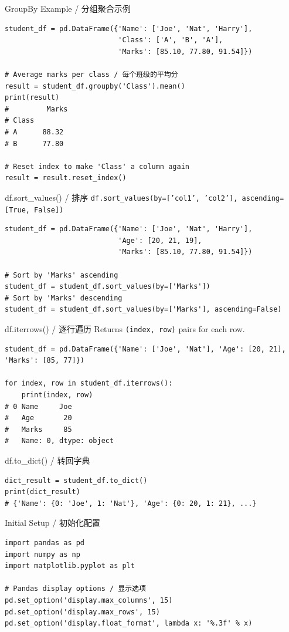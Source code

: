 \documentclass[11pt,a4paper]{report}
\let\oldtexttt\texttt
\renewcommand{\texttt}[1]{\textcolor{mainblue}{\oldtexttt{#1}}}
\begin{document}
\begin{examplebox}{GroupBy Example / 分组聚合示例}
\begin{lstlisting}
student_df = pd.DataFrame({'Name': ['Joe', 'Nat', 'Harry'],
                           'Class': ['A', 'B', 'A'],
                           'Marks': [85.10, 77.80, 91.54]})

# Average marks per class / 每个班级的平均分
result = student_df.groupby('Class').mean()
print(result)
#         Marks
# Class
# A      88.32
# B      77.80

# Reset index to make 'Class' a column again
result = result.reset_index()
\end{lstlisting}
\end{examplebox}

\begin{examplebox}{df.sort\_values() / 排序}
    \texttt{df.sort\_values(by=['col1', 'col2'], ascending=[True, False])}
\begin{lstlisting}
student_df = pd.DataFrame({'Name': ['Joe', 'Nat', 'Harry'],
                           'Age': [20, 21, 19],
                           'Marks': [85.10, 77.80, 91.54]})

# Sort by 'Marks' ascending
student_df = student_df.sort_values(by=['Marks'])
# Sort by 'Marks' descending
student_df = student_df.sort_values(by=['Marks'], ascending=False)
\end{lstlisting}
\end{examplebox}

\begin{examplebox}{df.iterrows() / 逐行遍历}
    Returns \texttt{(index, row)} pairs for each row.
\begin{lstlisting}
student_df = pd.DataFrame({'Name': ['Joe', 'Nat'], 'Age': [20, 21], 'Marks': [85, 77]})

for index, row in student_df.iterrows():
    print(index, row)
# 0 Name     Joe
#   Age       20
#   Marks     85
#   Name: 0, dtype: object
\end{lstlisting}
\end{examplebox}

\begin{examplebox}{df.to\_dict() / 转回字典}
\begin{lstlisting}
dict_result = student_df.to_dict()
print(dict_result)
# {'Name': {0: 'Joe', 1: 'Nat'}, 'Age': {0: 20, 1: 21}, ...}
\end{lstlisting}
\end{examplebox}

\begin{examplebox}{Initial Setup / 初始化配置}
\begin{lstlisting}
import pandas as pd
import numpy as np
import matplotlib.pyplot as plt

# Pandas display options / 显示选项
pd.set_option('display.max_columns', 15)
pd.set_option('display.max_rows', 15)
pd.set_option('display.float_format', lambda x: '%.3f' % x)
\end{lstlisting}
\end{examplebox}
\end{document}
